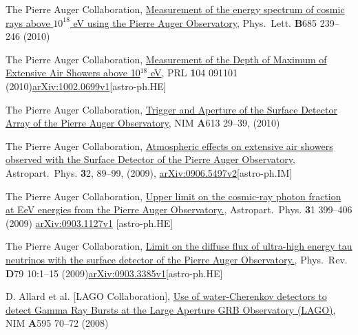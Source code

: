 \begin{etaremune}
\item {}The Pierre Auger Collaboration,
\href{http://dx.doi.org/10.1016/j.physletb.2010.02.013}{{Measurement of
the energy spectrum of cosmic rays above $10^{18}$ eV using the Pierre Auger
Observatory}}, Phys.\ Lett. {\textbf B685} 239--246 (2010) %

\item {}The Pierre Auger Collaboration,
\href{http://dx.doi.org/10.1103/PhysRevLett.104.091101}{{Measurement of
the Depth of Maximum of Extensive Air Showers above 10$^{18}$ eV}}, PRL {\textbf
104} 091101
(2010)\href{http://arxiv.org/abs/1002.0699}{arXiv:1002.0699v1}[astro-ph.HE]

\item {}The Pierre Auger Collaboration,
\href{http://dx.doi.org/10.1016/j.nima.2009.11.018}{{Trigger and Aperture
of the Surface Detector Array of the Pierre Auger Observatory}}, NIM {\textbf A613}
29--39, (2010)

\item {} The Pierre Auger Collaboration,
\href{http://dx.doi.org/10.1016/j.astropartphys.2009.06.004}{{Atmospheric
effects on extensive air showers observed with the Surface Detector of the
Pierre Auger Observatory}}, Astropart.\ Phys. {\textbf 32}, 89--99, (2009),
\href{http://arxiv.org/abs/0906.5497/}{arXiv:0906.5497v2}[astro-ph.IM]

\item {}The Pierre Auger Collaboration,
\href{http://dx.doi.org/10.1016/j.astropartphys.2009.04.003}{{Upper limit
on the cosmic-ray photon fraction at EeV energies from the Pierre Auger
Observatory.}}, Astropart.\ Phys. {\textbf 31} 399--406 (2009)
\href{http://arxiv.org/abs/0903.1127/}{arXiv:0903.1127v1} [astro-ph.HE]

\item {}The Pierre Auger Collaboration,
\href{http://dx.doi.org/10.1103/PhysRevD.79.102001}{{Limit on the diffuse
flux of ultra-high energy tau neutrinos with the surface detector of the Pierre
Auger Observatory.}}, Phys.\ Rev. {\textbf D79} 10:1--15
(2009)\href{http://arxiv.org/abs/0903.3385/}{arXiv:0903.3385v1}[astro-ph.HE]

\item {}D. Allard { et al.} [LAGO Collaboration],
\href{http://dx.doi.org/10.1016/j.nima.2008.07.041}{{Use of
water-Cherenkov detectors to detect Gamma Ray Bursts at the Large Aperture GRB
Observatory (LAGO)}}, NIM {\textbf A595} 70--72 (2008)


\end{etaremune}
